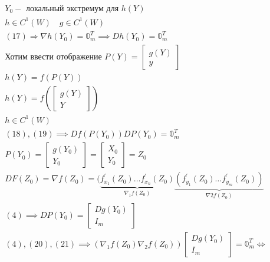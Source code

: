 \documentclass[main]{subfiles}
\begin{document}
\begin{longProof}
\begin{gather*}
             Y_0 - \text { локальный экстремум для } h(Y) \tag{17}\\
             h \in C^1(W) \quad g \in C^1(W) \\
            (17) \Rightarrow \nabla h(Y_0) = \mathbb{0}^T_m  \implies
            Dh(Y_0) = \mathbb{0}^T_m \tag{18} \\
            \text{Хотим ввести отображение } P(Y) = \begin{bmatrix*}
                g(Y) \\
                y
            \end{bmatrix*} \\
             h(Y) = f(P(Y)) \tag{19} \\
             h(Y) = f \left( \begin{bmatrix*}
                g(Y) \\
                Y
             \end{bmatrix*} \right) \\
             h \in C^1(W) \\
             (18), (19) \implies Df(P(Y_0))DP(Y_0) = \mathbb{0}^T_m \tag{20} \\
             P(Y_0) = \begin{bmatrix*}
                g(Y_0) \\
                Y_0
             \end{bmatrix*} = \begin{bmatrix*}
                X_0 \\
                Y_0 
             \end{bmatrix*} = Z_0 \\
             DF(Z_0) = \nabla f(Z_0) = (\underbrace{f^\prime_{x_1}(Z_0) \ldots f^\prime_{x_n}(Z_0)}_{\nabla_1 f(Z_0)} \underbrace{(f^\prime_{y_1}(Z_0) \ldots f^\prime_{y_m}(Z_0))}_{\nabla 2 f(Z_0)} \tag{21} \\
             (4) \implies DP(Y_0)  = \begin{bmatrix*}
                Dg(Y_0) \\
                I_m
             \end{bmatrix*} \tag{4\prime} \\
             (4), (20), (21) \implies (\nabla_1 f(Z_0) \nabla_2 f(Z_0)) \begin{bmatrix*}
                Dg(Y_0) \\
                I_m
             \end{bmatrix*} = \mathbb{0}^T_m \Leftrightarrow \\

\end{gather*}
\end{longProof}
\end{document}
